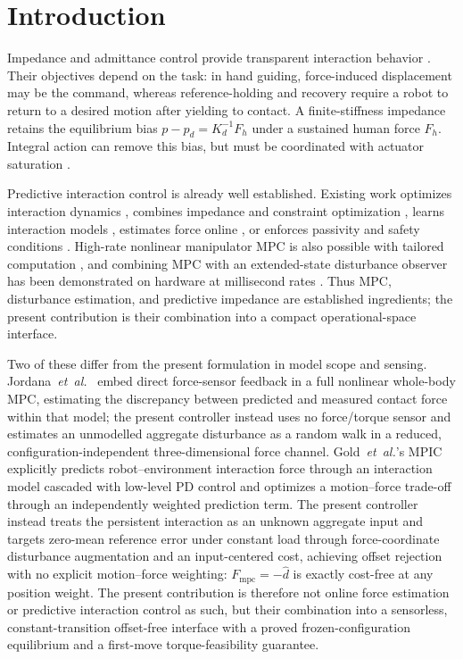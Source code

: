 \documentclass[conference]{IEEEtran}
\newcommand{\Fmpc}{F_{\mathrm{mpc}}}
\newcommand{\dhat}{\hat d}
\begin{document}
\section{Introduction}

Impedance and admittance control provide transparent interaction behavior
\cite{hogan1985impedance,chiaverini1999survey}. Their objectives depend on the
task: in hand guiding, force-induced displacement may be the command, whereas
reference-holding and recovery require a robot to return to a desired motion
after yielding to contact. A finite-stiffness impedance retains the equilibrium
bias $p-p_d=K_d^{-1}F_h$ under a sustained human force $F_h$. Integral action
can remove this bias, but must be coordinated with actuator saturation
\cite{cao2004antiwindup,cao2002antiwindup}.

Predictive interaction control is already well established. Existing work
optimizes interaction dynamics \cite{gold2023mpic}, combines impedance and
constraint optimization \cite{chen2025unified}, learns interaction models
\cite{haninger2023model}, estimates force online \cite{jordana2024force}, or
enforces passivity and safety conditions
\cite{cao2023passive,matschek2023safe}. High-rate nonlinear manipulator MPC is
also possible with tailored computation \cite{kleff2021highfrequency}, and
combining MPC with an extended-state disturbance observer has been
demonstrated on hardware at millisecond rates \cite{wu2025ensuring}. Thus
MPC, disturbance estimation, and predictive impedance are established
ingredients; the present contribution is their combination into a compact
operational-space interface.

Two of these differ from the present formulation in model scope and sensing.
Jordana~\emph{et~al.}~\cite{jordana2024force} embed direct force-sensor
feedback in a full nonlinear whole-body MPC, estimating the discrepancy
between predicted and measured contact force within that model; the present
controller instead uses no force/torque sensor and estimates an unmodelled
aggregate disturbance as a random walk in a reduced, configuration-independent
three-dimensional force channel. Gold~\emph{et~al.}'s MPIC
\cite{gold2023mpic} explicitly predicts robot--environment interaction force
through an interaction model cascaded with low-level PD control and
optimizes a motion--force trade-off through an independently weighted
prediction term. The present controller instead treats the persistent
interaction as an unknown aggregate input and targets zero-mean reference
error under constant load through force-coordinate disturbance augmentation
and an input-centered cost, achieving offset rejection with no explicit
motion--force weighting:
$\Fmpc=-\dhat$ is exactly cost-free at any position weight. The present
contribution is therefore not online force estimation or predictive
interaction control as such, but their combination into a sensorless,
constant-transition offset-free interface with a proved frozen-configuration
equilibrium and a first-move torque-feasibility guarantee.
\end{document}

